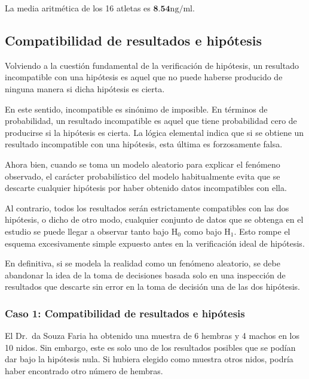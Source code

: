 \documentclass[
]{article}
\begin{document}
La media aritmética de los 16 atletas es \(\mathbf{8 . 5 4} \mathrm{ng} / \mathrm{ml}\).

\subsection{Compatibilidad de resultados e hipótesis}\label{compatibilidad-de-resultados-e-hipuxf3tesis}

Volviendo a la cuestión fundamental de la verificación de hipótesis, un resultado incompatible con una hipótesis es aquel que no puede haberse producido de ninguna manera si dicha hipótesis es cierta.

En este sentido, incompatible es sinónimo de imposible. En términos de probabilidad, un resultado incompatible es aquel que tiene probabilidad cero de producirse si la hipótesis es cierta. La lógica elemental indica que si se obtiene un resultado incompatible con una hipótesis, esta última es forzosamente falsa.

Ahora bien, cuando se toma un modelo aleatorio para explicar el fenómeno observado, el carácter probabilístico del modelo habitualmente evita que se descarte cualquier hipótesis por haber obtenido datos incompatibles con ella.

Al contrario, todos los resultados serán estrictamente compatibles con las dos hipótesis, o dicho de otro modo, cualquier conjunto de datos que se obtenga en el estudio se puede llegar a observar tanto bajo \(\mathrm{H}_{0}\) como bajo \(\mathrm{H}_{1}\). Esto rompe el esquema excesivamente simple expuesto antes en la verificación ideal de hipótesis.

En definitiva, si se modela la realidad como un fenómeno aleatorio, se debe abandonar la idea de la toma de decisiones basada solo en una inspección de resultados que descarte sin error en la toma de decisión una de las dos hipótesis.

\subsubsection{Caso 1: Compatibilidad de resultados e hipótesis}\label{caso-1-compatibilidad-de-resultados-e-hipuxf3tesis}

El Dr.~da Souza Faria ha obtenido una muestra de 6 hembras y 4 machos en los 10 nidos. Sin embargo, este es solo uno de los resultados posibles que se podían dar bajo la hipótesis nula. Si hubiera elegido como muestra otros nidos, podría haber encontrado otro número de hembras.
\end{document}
